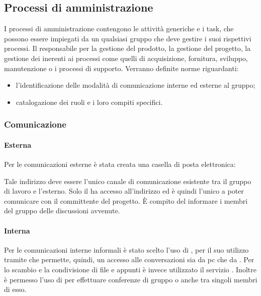 \documentclass[12pt,a4paper]{article}
\begin{document}
\subsection{Processi di amministrazione}
I processi di amministrazione contengono le attività generiche e i task, che possono essere impiegati da un qualsiasi gruppo che deve gestire i suoi rispettivi processi. Il \PM{} responsabile per la gestione del prodotto, la gestione del progetto, la gestione dei  inerenti ai processi come quelli di acquisizione, fornitura, sviluppo, manutenzione o i processi di supporto. Verranno definite norme riguardanti:
\begin{itemize}
	\item l'identificazione delle modalità di comunicazione interne ed esterne al gruppo;
	\item catalogazione dei ruoli e i loro compiti specifici.
\end{itemize}

\subsubsection{Comunicazione}
\paragraph{Esterna}
Per le comunicazioni esterne è stata creata una casella di posta elettronica:
\begin{center}
	\href{mailto:\mailGruppo{}}{\mailGruppo{}}
\end{center}
Tale indirizzo deve essere l'unico canale di comunicazione esistente tra il gruppo di lavoro e l'esterno. Solo il \PM{} ha accesso all'indirizzo ed è quindi l'unico a poter comunicare con il committente del progetto. È compito del \PM{} informare i membri del gruppo delle discussioni avvenute.

\paragraph{Interna}
Per le comunicazioni interne informali è stato scelto l'uso di , per il suo utilizzo tramite  che permette, quindi, un accesso alle conversazioni sia da pc che da . Per lo scambio e la condivisione di file e appunti è invece utilizzato il servizio  . Inoltre è permesso l'uso di  per effettuare conferenze di gruppo o anche tra singoli membri di esso.
\end{document}
